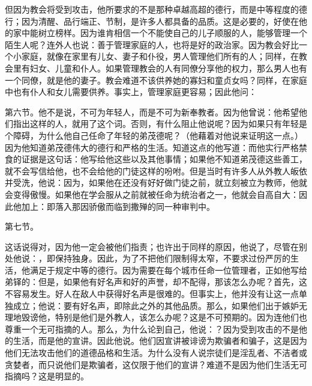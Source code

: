 但因为教会将受到攻击，他所要求的不是那种卓越高超的德行，而是中等程度的德行；因为清醒、品行端正、节制，是许多人都具备的品质。这是必要的，好使在他的家中能树立榜样。因为谁肯相信一个不能使自己的儿子顺服的人，能够管理一个陌生人呢？连外人也说：善于管理家庭的人，也将是好的政治家。因为教会好比一个小家庭，就像在家里有儿女、妻子和仆役，男人管理他们所有的人；同样，在教会里有妇女、儿童和仆人。如果管理教会的人有同僚分享他的权力，那么男人也有一个同僚，就是他的妻子。教会难道不该供养她的寡妇和童贞女吗？同样，在家庭中也有仆人和女儿需要供养。事实上，管理家庭更容易；因此他问：\par

第六节。他不是说，不可为年轻人，而是不可为新奉教者。因为他曾说：他希望他们指出这样的人，就用了这个词。否则，有什么阻止他说呢？因为如果只有年轻是个障碍，为什么他自己任命了年轻的弟茂德呢？（他藉着对他说来证明这一点。）因为他知道弟茂德伟大的德行和严格的生活。知道这点的他写道：而他实行严格禁食的证据是这句话：他写给他这些以及其他事情；如果他不知道弟茂德这些善工，就不会写信给他，也不会给他的门徒这样的吩咐。但是当时有许多人从外教人皈依并受洗，他说：因为，如果他在还没有好好做门徒之前，就立刻被立为教师，他就会变得傲慢。如果他在学会服从之前就被任命为统治者之一，他就会自高自大：因此他加上：即落入那因骄傲而临到撒殚的同一种审判中。\par

第七节。\par

这话说得对，因为他一定会被他们指责；也许出于同样的原因，他说了，尽管在别处他说：，即保持独身。因此，为了不把他们限制得太窄，不要求过份严厉的生活，他满足于规定中等的德行。因为需要在每个城市任命一位管理者，正如他写给弟铎的：但是，如果他有好名声和好的声誉，却不配得，那该怎么办呢？首先，这不容易发生。好人在敌人中获得好名声是很难的。但事实上，他并没有让这一点单独成立；他说：要有好名声，即除此之外的其他品质。那么，如果他们出于嫉妒无理地毁谤他，特别是他们是外教人，该怎么办呢？这是不可预期的。因为连他们也尊重一个无可指摘的人。那么，为什么论到自己，他说：？因为受到攻击的不是他的生活，而是他的宣讲。因此他说。他们因宣讲被诽谤为欺骗者和骗子，这是因为他们无法攻击他们的道德品格和生活。为什么没有人说宗徒们是淫乱者、不洁者或贪婪者，而只说他们是欺骗者，这仅限于他们的宣讲？难道不是因为他们生活无可指摘吗？这是明显的。\par

